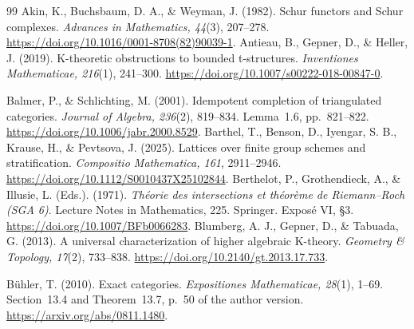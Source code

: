 \documentclass[11pt,a4paper]{article}
\theoremstyle{definition}\newtheorem{definition}[theorem]{Definition}
\theoremstyle{remark}\newtheorem{remark}[theorem]{Remark}
\begin{document}
\begingroup\small{}\setlength{\bibsep}{4pt}
\begin{thebibliography}{99}
Akin, K., Buchsbaum, D. A., \& Weyman, J. (1982).
Schur functors and Schur complexes.
\emph{Advances in Mathematics, 44}(3), 207--278.
\url{https://doi.org/10.1016/0001-8708(82)90039-1}.
Antieau, B., Gepner, D., \& Heller, J. (2019).
K-theoretic obstructions to bounded t-structures.
\emph{Inventiones Mathematicae, 216}(1), 241--300.
\url{https://doi.org/10.1007/s00222-018-00847-0}.

Balmer, P., \& Schlichting, M. (2001). Idempotent completion of
triangulated categories. \emph{Journal of Algebra, 236}(2), 819--834.
Lemma~1.6, pp.~821--822.
\url{https://doi.org/10.1006/jabr.2000.8529}.
Barthel, T., Benson, D., Iyengar, S. B., Krause, H., \& Pevtsova, J.
(2025). Lattices over finite group schemes and stratification.
\emph{Compositio Mathematica, 161}, 2911--2946.
\url{https://doi.org/10.1112/S0010437X25102844}.
Berthelot, P., Grothendieck, A., \& Illusie, L. (Eds.). (1971).
\emph{Th\'eorie des intersections et th\'eor\`eme de Riemann--Roch
(SGA 6)}. Lecture Notes in Mathematics, 225. Springer.
Expos\'e VI, \S3. \url{https://doi.org/10.1007/BFb0066283}.
Blumberg, A. J., Gepner, D., \& Tabuada, G. (2013).
A universal characterization of higher algebraic K-theory.
\emph{Geometry \& Topology, 17}(2), 733--838.
\url{https://doi.org/10.2140/gt.2013.17.733}.

B\"uhler, T. (2010). Exact categories.
\emph{Expositiones Mathematicae, 28}(1), 1--69.
Section~13.4 and Theorem~13.7, p.~50 of the author version.
\url{https://arxiv.org/abs/0811.1480}.


\end{thebibliography}
\end{document}
